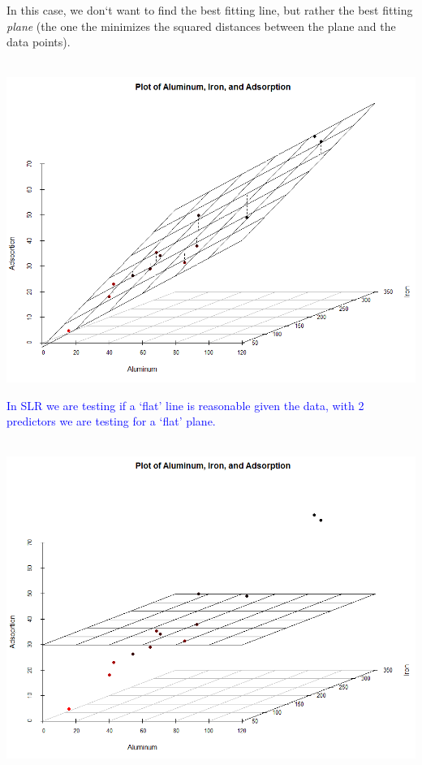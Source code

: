 In this case, we don`t want to find the best fitting line, but rather the best fitting \textit{plane} (the one the minimizes the squared distances between the plane and the data points). \\~\\

\begin{flushleft}
\includegraphics[scale=0.45]{adsorptionplot3d}
\end{flushleft}

\textcolor{blue}{In SLR we are testing if a `flat' line is reasonable given the data, with 2 predictors we are testing for a `flat' plane.}\\~\\

\begin{flushleft}
\includegraphics[scale=0.45]{adsorptionplot3dNull}
\end{flushleft}

